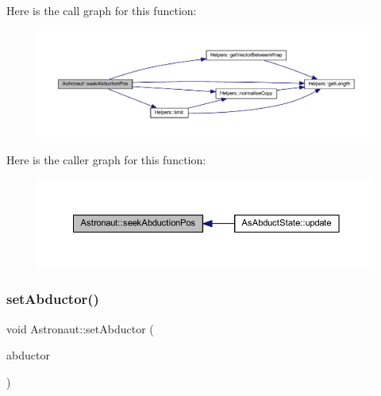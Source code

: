 Here is the call graph for this function\+:
\nopagebreak
\begin{figure}[H]
\begin{center}
\leavevmode
\includegraphics[width=350pt]{class_astronaut_aa9f03535d8f48b807838d28885904e59_cgraph}
\end{center}
\end{figure}
Here is the caller graph for this function\+:
\nopagebreak
\begin{figure}[H]
\begin{center}
\leavevmode
\includegraphics[width=350pt]{class_astronaut_aa9f03535d8f48b807838d28885904e59_icgraph}
\end{center}
\end{figure}
\mbox{\label{class_astronaut_a78272dce915584767db158d231af27d7}} 
\subsubsection{\texorpdfstring{set\+Abductor()}{setAbductor()}}
{\footnotesize\ttfamily void Astronaut\+::set\+Abductor (\begin{DoxyParamCaption}\item[{const std\+::shared\+\_\+ptr$<$ \hyperlink{class_game_object}{Game\+Object} $>$ \&}]{abductor }\end{DoxyParamCaption})}

\mbox{\label{class_astronaut_a8ca3c9ed488fe685374247cc7e234d81}} 
